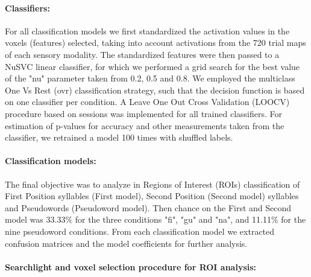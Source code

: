 
\paragraph{Classifiers:}
For all classification models we first standardized the activation values in the voxels (features) selected, taking into account activations from the 720 trial maps of each sensory modality.
The standardized features were then passed to a NuSVC linear classifier, for which we performed a grid search for the best value of the "nu" parameter taken from 0.2, 0.5 and 0.8.
We employed the multiclass One Vs Rest (ovr) classification strategy, such that the decision function is based on one classifier per condition.
A Leave One Out Cross Validation (LOOCV) procedure based on sessions was implemented for all trained classifiers.
For estimation of p-values for accuracy and other measurements taken from the classifier, we retrained a model 100 times with shuffled labels.


\paragraph{Classification models:}
The final objective was to analyze in Regions of Interest (ROIs) classification of First Position syllables (First model), Second Position (Second model) syllables and Pseudowords (Pseudoword model).
Then chance on the First and Second model was 33.33\% for the three conditions "fi", "gu" and "na", and 11.11\% for the nine pseudoword conditions.
From each classification model we extracted confusion matrices and the model coefficients for further analysis.

\paragraph{Searchlight and voxel selection procedure for ROI analysis:}


